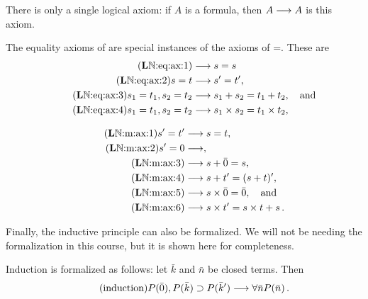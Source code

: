 \begin{axiom}\label{axi:logical axioms of PA}
    There is only a single logical axiom: if \(A\) is a formula,
    then \(A\longrightarrow A\) is this axiom.
\end{axiom}
\begin{axiom}\label{axi:equality axioms of PA}
    The equality axioms of \PA{} are special instances of the axioms
    of \LK=. These are
    \begin{align}
        \tag{\LN:eq:ax:1}\label{LN:eq:ax:1}
        &\seq s=s \\
        \tag{\LN:eq:ax:2}\label{LN:eq:ax:2}
        s = t &\seq s'=t', \\
        \tag{\LN:eq:ax:3}\label{LN:eq:ax:3}
        s_1=t_1, s_2=t_2 &\seq s_1+s_2 =t_1+t_2,
        \quad\text{and} \\
        \tag{\LN:eq:ax:4}\label{LN:eq:ax:4}
        s_1=t_1, s_2=t_2 &\seq s_1\times s_2 =t_1\times t_2,
    \end{align}
\end{axiom}
\begin{axiom}\label{axi:mathematical axioms of PA}
    \begin{align}
        \tag{\LN:m:ax:1}\label{LN:m:ax:1}
        s'=t'&\seq s=t, \\
        \tag{\LN:m:ax:2}\label{LN:m:ax:2}
        s' = 0 &\seq, \\
        \tag{\LN:m:ax:3}\label{LN:m:ax:3}
        &\seq s + \bar0 = s, \\
        \tag{\LN:m:ax:4}\label{LN:m:ax:4}
        &\seq s + t' = (s+t)', \\
        \tag{\LN:m:ax:5}\label{LN:m:ax:5}
        &\seq s\times\bar0 = \bar0,
        \quad\text{and} \\
        \tag{\LN:m:ax:6}\label{LN:m:ax:6}
        &\seq s\times t' = s \times t + s\,.
    \end{align}
\end{axiom}

Finally, the inductive principle can also be formalized.
We will not be needing the formalization in this course,
but it is shown here for completeness.

\begin{axiom}\label{axi:inductive axiom}
    Induction is formalized as follows:
    let \(\bar k\) and \(\bar n\) be closed terms. Then
    \begin{equation}\tag{induction}\label{induction}
        P(\bar0), P(\bar k)\supset P(\bar k') \longrightarrow \forall\bar nP(\bar n)\,.
    \end{equation}
\end{axiom}


